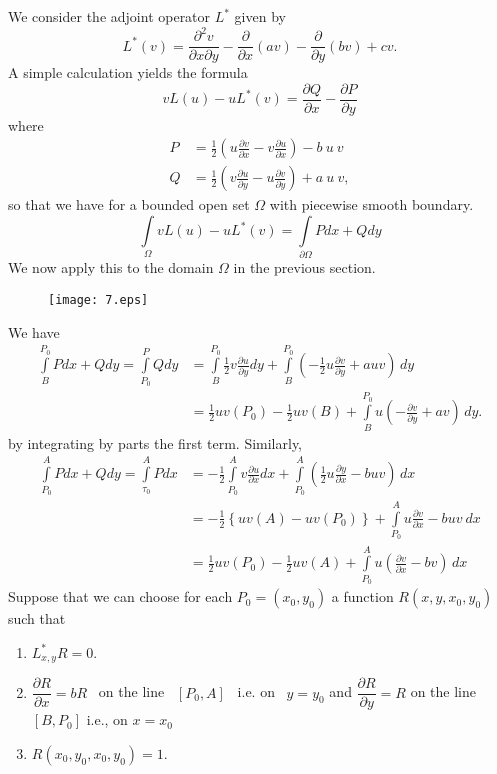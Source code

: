 We consider the adjoint operator $L^{\ast}$ given by
$$
L^{\ast}(v)=\frac{\partial^{2}v}{\partial x\partial y}-\frac{\partial}{\partial x}(av)-\frac{\partial}{\partial y}(bv)+cv.
$$
A simple calculation yields the formula
$$
vL(u)-uL^{\ast}(v)=\frac{\partial Q}{\partial x}-\frac{\partial P}{\partial y}
$$
where
\begin{align*}
P &= \frac{1}{2}\left(u\frac{\partial v}{\partial x}-v\frac{\partial u}{\partial x}\right)-b \ u \ v\\[3pt]
Q &= \frac{1}{2}\left(v\frac{\partial u}{\partial y}-u\frac{\partial v}{\partial y}\right)+a \ u \ v,
\end{align*}
so that we have for a bounded open set $\Omega$ with piecewise smooth boundary.
$$
\int\limits_{\Omega}vL(u)-uL^{\ast}(v)=\int\limits_{\partial \Omega}Pdx+Qdy
$$
We now apply this to the domain $\Omega$ in the previous section.
\begin{figure}[H]
\centering
\texttt{[image: 7.eps]}
\end{figure}

We have
\begin{align*}
\int\limits^{P_{0}}_{B}Pdx+Qdy=\int\limits^{P}_{P_{0}}Qdy &= \int\limits^{P_{0}}_{B}\frac{1}{2}v\frac{\partial u}{\partial y}dy+\int\limits^{P_{0}}_{B}\left(-\frac{1}{2}u\frac{\partial v}{\partial y}+auv\right)\,dy\\[4pt]
&= \frac{1}{2}uv(P_{0})-\frac{1}{2}uv(B)+\int\limits^{P_{0}}_{B}u\left(-\frac{\partial v}{\partial y}+av\right)\,dy.
\end{align*}\pageoriginale
by integrating by parts the first term. Similarly,
\begin{align*}
\int\limits^{A}_{P_{0}}Pdx+Qdy=\int\limits^{A}_{\tau_{0}}Pdx &= -\frac{1}{2}\int\limits^{A}_{P_{0}}v\frac{\partial u}{\partial x}dx+\int\limits^{A}_{P_{0}}\left(\frac{1}{2}u\frac{\partial y}{\partial x}-buv\right)\,dx\\[4pt]
&= -\frac{1}{2}\left\{uv(A)-uv(P_{0})\right\}+\int\limits^{A}_{P_{0}}u\frac{\partial v}{\partial x}-buv \ dx\\[4pt]
&= \frac{1}{2}uv(P_{0})-\frac{1}{2}uv(A)+\int\limits^{A}_{P_{0}}u\left(\frac{\partial v}{\partial x}-bv\right)\,dx
\end{align*}
Suppose that we can choose for each $P_{0}=(x_{0},y_{0})$ a function $R(x,y,x_{0},y_{0})$ such that
\begin{enumerate}
\renewcommand{\labelenumi}{(\theenumi)}
\item $L^{\ast}_{x,y}R=0$.

\item $\dfrac{\partial R}{\partial x}=bR$ \ on the line \ $[P_{0},A]$ \ i.e. on \ $y=y_{0}$ and $\dfrac{\partial R}{\partial y}=R$ on the line $[B, P_{0}]$ i.e., on $x=x_{0}$

\item $R(x_{0},y_{0},x_{0},y_{0})=1$.
\end{enumerate}

